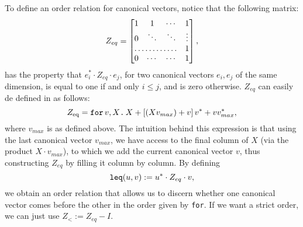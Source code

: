 To define an order relation for canonical vectors, notice that the following matrix:
\[
Z_{eq} = \begin{bmatrix}
    1 & 1 & \cdots &  1 \\
    0 & \ddots & \ddots & \vdots \\
    \hdotsfor{3} & 1 \\
    0 & \cdots & \cdots & 1 
\end{bmatrix},
\] 
has the property that $e_i^*\cdot Z_{eq} \cdot e_j$, for two canonical vectors $e_i,e_j$ of the same dimension, is equal to one if and only $i\leq j$, and is zero otherwise. $Z_{eq}$ can easily de defined in \langfor as follows:
$$Z_{\text{eq}}=\texttt{for}\, v,X \texttt{.}\, X + \left[ (Xv_{max}) + v \right]v^* + vv^*_{max},$$
where $v_{max}$ is as defined above. The intuition behind this expression is that using the last canonical vector $v_{max}$, we have access to the final column of $X$ (via the product $X\cdot v_{max}$), to which we add the current canonical vector $v$, thus constructing $Z_{eq}$ by filling it column by column. By defining $$\texttt{leq}(u,v) := u^*\cdot Z_{eq} \cdot v,$$
we obtain an order relation that allows us to discern whether one canonical vector comes before the other in the order given by \texttt{for}. If we want a strict order, we can just use $Z_< := Z_{eq} - I$.

